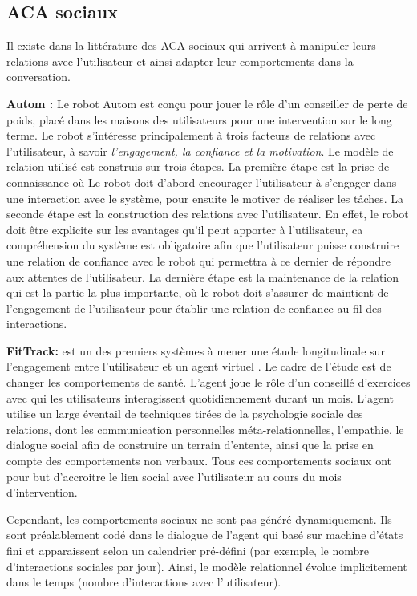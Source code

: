 \documentclass[a4paper,french]{article}
\begin{document}
\subsection{ACA sociaux}
\par Il existe dans la littérature des  ACA sociaux  qui arrivent à manipuler leurs relations avec l'utilisateur et ainsi adapter leur comportements dans la conversation.


\par \textbf{Autom :} Le robot Autom \cite{kidd2005sociable} est conçu pour jouer le rôle d'un conseiller de perte de poids, placé dans les maisons des utilisateurs pour une intervention sur le long terme. Le robot s'intéresse principalement à trois facteurs de relations avec l'utilisateur, à savoir \textit{l'engagement, la confiance et la motivation}.  Le modèle de relation utilisé est construis sur trois étapes. La première étape est la prise de connaissance où Le robot doit  d'abord encourager l'utilisateur à s'engager dans une interaction avec le système, pour ensuite le motiver de réaliser les tâches.
La seconde étape est la construction des relations avec l'utilisateur. En effet, le robot doit être explicite sur les avantages qu'il peut apporter à l'utilisateur, ca compréhension du système est obligatoire afin que l'utilisateur puisse construire une relation de confiance avec le robot qui permettra à ce dernier de répondre aux attentes de l'utilisateur.  La dernière étape est la maintenance de la relation qui est la partie la plus importante, où le robot doit s'assurer de maintient de l'engagement de l'utilisateur pour établir une relation de confiance au fil des interactions.


\par \textbf{FitTrack: } est un des premiers systèmes à mener une étude longitudinale sur l'engagement entre l'utilisateur et un agent virtuel \cite{bickmore2005s}. Le cadre de l'étude est de changer les comportements de santé. L'agent joue le rôle d'un conseillé d'exercices avec qui les utilisateurs interagissent quotidiennement durant un mois. L'agent utilise un large éventail de techniques tirées de la psychologie sociale des relations, dont les communication personnelles méta-relationnelles, l'empathie, le dialogue social afin de construire un terrain d'entente, ainsi que la prise en compte des comportements non verbaux. Tous ces comportements sociaux ont pour but d'accroitre le lien social avec l'utilisateur au cours du mois d'intervention.

\par Cependant, les comportements sociaux ne sont pas généré dynamiquement. Ils sont préalablement codé dans le dialogue de l'agent qui basé sur machine d'états fini et apparaissent selon un calendrier pré-défini (par exemple, le nombre d'interactions sociales par jour). Ainsi, le modèle relationnel évolue implicitement dans le temps (nombre d'interactions avec l'utilisateur).
\end{document}
